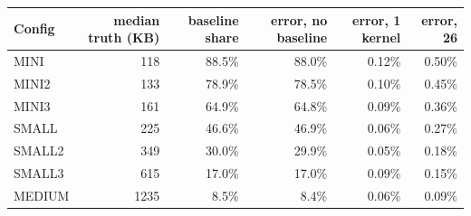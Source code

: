 \begin{tabular}{lrrrrr}
\toprule
Config & median truth (KB) & baseline share & error, no baseline & error, 1 kernel & error, 26 \\
\midrule
MINI & 118 & 88.5\% & 88.0\% & 0.12\% & 0.50\% \\
MINI2 & 133 & 78.9\% & 78.5\% & 0.10\% & 0.45\% \\
MINI3 & 161 & 64.9\% & 64.8\% & 0.09\% & 0.36\% \\
SMALL & 225 & 46.6\% & 46.9\% & 0.06\% & 0.27\% \\
SMALL2 & 349 & 30.0\% & 29.9\% & 0.05\% & 0.18\% \\
SMALL3 & 615 & 17.0\% & 17.0\% & 0.09\% & 0.15\% \\
MEDIUM & 1235 & 8.5\% & 8.4\% & 0.06\% & 0.09\% \\
\bottomrule
\end{tabular}
